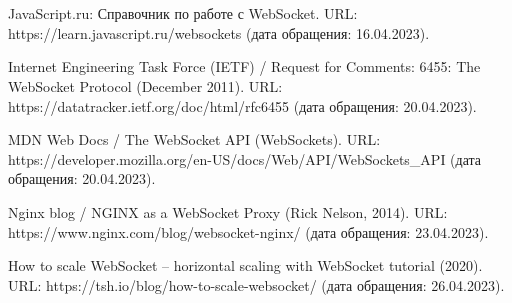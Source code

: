 \section*{}

\begin{thebibliography}{00}

 JavaScript.ru: Справочник по работе с WebSocket. URL: https://learn.javascript.ru/websockets (дата обращения: 16.04.2023).

 Internet Engineering Task Force (IETF) / Request for Comments: 6455: The WebSocket Protocol (December 2011). URL: https://datatracker.ietf.org/doc/html/rfc6455 (дата обращения: 20.04.2023).

 MDN Web Docs / The WebSocket API (WebSockets). URL: https://developer.mozilla.org/en-US/docs/Web/API/WebSockets\_API (дата обращения: 20.04.2023).

 Nginx blog / NGINX as a WebSocket Proxy (Rick Nelson, 2014). URL: https://www.nginx.com/blog/websocket-nginx/ (дата обращения: 23.04.2023).

 How to scale WebSocket – horizontal scaling with WebSocket tutorial (2020). URL: https://tsh.io/blog/how-to-scale-websocket/ (дата обращения: 26.04.2023).

\end{thebibliography}